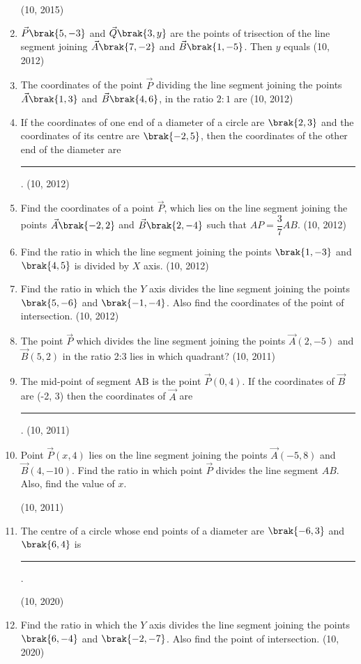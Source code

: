 \begin{enumerate}[label=\thesubsection.\arabic*,ref=\thesubsection.\theenumi]
		\hfill (10, 2015)
\item  $\vec{P}\brak{5,-3}$ and $\vec{Q}\brak{3,y}$ are the points of trisection of the line segment joining $\vec{A}\brak{7,-2}$ and $\vec{B}\brak{1,-5}$. Then $y$ equals
\hfill (10, 2012)
\item The coordinates of the point $\vec{P}$ dividing the line segment joining the points $\vec{A}\brak{1,3}$ and $\vec{B}\brak{4,6}$, in the ratio $2:1$ are
\hfill (10, 2012)
\item If the coordinates of one end of a diameter of a circle are $\brak{2,3}$ and the coordinates of its centre are $\brak{-2,5}$, then the coordinates of the other end of the diameter are
\rule{1cm}{0.2pt}.
\hfill (10, 2012)
\item Find the coordinates of a point $\vec{P}$, which lies on the line segment joining the points $\vec{A}\brak{-2,2}$ and $\vec{B}\brak{2,-4}$ such that $AP = \dfrac{3}{7} AB$. 
\hfill (10, 2012)
\item Find the ratio in which the line segment joining the points $\brak{1,-3}$ and $\brak{4,5}$ is divided by $X$ axis. 
\hfill (10, 2012)
\item Find the ratio in which the $Y$ axis divides the line segment joining the points $\brak{5,-6}$ and $\brak{-1,-4}$. Also find the coordinates of the point of intersection. 
\hfill (10, 2012)
    \item The point $\vec{P}$ which divides the line segment joining the points $\vec{A}(2, - 5)$ and $\vec{B}(5, 2)$ in the ratio 2:3 lies in which quadrant?
\hfill (10, 2011)
    \item The mid-point of segment AB is the point $\vec{P}( 0, 4)$. If the coordinates of $\vec{B}$ are (-2, 3) then the coordinates of $\vec{A}$ are \rule{1cm}{0.1pt}.
\hfill (10, 2011)
\item Point $\vec{P}(x, 4)$ lies on the line segment joining the points $\vec{A} (-5,8)$ and $\vec{B} (4, -10)$. Find the ratio in which point $\vec{P}$ divides the line segment $AB$. Also, find the value of $x$.

\hfill (10, 2011)
\item The centre of a circle whose end points of a diameter are $\brak{-6,3}$ and $\brak{6,4}$ is
\rule{1cm}{0.2pt}.

\hfill (10, 2020)
\item Find the ratio in which the $Y$ axis divides the line segment joining the points $\brak{6,-4}$ and $\brak{-2, -7}$. Also find the point of intersection.
\hfill (10, 2020)
\end{enumerate}
